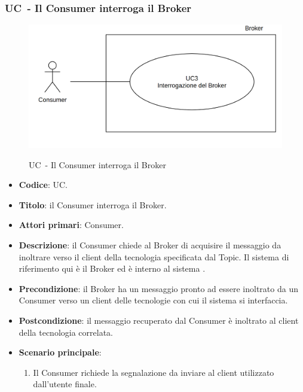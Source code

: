 \subsubsection{UC\theuccount\ - Il Consumer interroga il Broker}
	\begin{figure}[H]
		\centering
		\includegraphics[width=\columnwidth]{img/UC3.png}\\
		\caption{UC\theuccount\ - Il Consumer interroga il Broker}
	\end{figure}
	\begin{itemize}
		\item \textbf{Codice}: UC\theuccount.
		\item \textbf{Titolo}: il Consumer interroga il Broker.
		\item \textbf{Attori primari}: Consumer.
		\item \textbf{Descrizione}: il Consumer chiede al Broker di acquisire il messaggio da inoltrare verso il client della tecnologia specificata dal Topic. Il sistema di riferimento qui è il Broker ed è interno al sistema \progetto.
		\item \textbf{Precondizione}: il Broker ha un messaggio pronto ad essere inoltrato da un Consumer verso un client delle tecnologie con cui il sistema si interfaccia.
		\item \textbf{Postcondizione}: il messaggio recuperato dal Consumer è inoltrato al client della tecnologia correlata.
		\item \textbf{Scenario principale}: 
			\begin{enumerate}
				\item Il Consumer richiede la segnalazione da inviare al client utilizzato dall'utente finale.
			\end{enumerate}
	\end{itemize}

